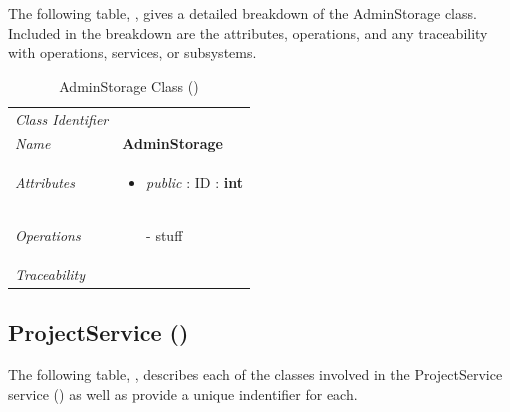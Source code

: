 \documentclass[12pt,letterpaper]{article}
\begin{document}
The following table, , gives a detailed breakdown of the AdminStorage class. Included in the breakdown are the attributes, operations, and any traceability with operations, services, or subsystems.

\begin{table}[H]
    \caption{AdminStorage Class ()} 
	\begin{tabu} to 
		\toprule
		Class Identifier &  \\
		Name & {\bf AdminStorage} \\
		Attributes & 
		\begin{minipage}[t]{\linewidth}
		    \begin{itemize}
		        \item \textit{public} : ID : \bf{int}
			\end{itemize}
	    \end{minipage} \\

		Operations &
		\begin{minipage}[t]{\linewidth}
			\begin{enumerate}
			    \item[-] stuff
	        \end{enumerate}
	    \end{minipage} \\
	    	Traceability & \\
		\toprule
	\end{tabu}
\end{table}

\subsection{ProjectService ()}

The following table, , describes each of the classes involved in the ProjectService service () as well as provide a unique indentifier for each.
\end{document}
